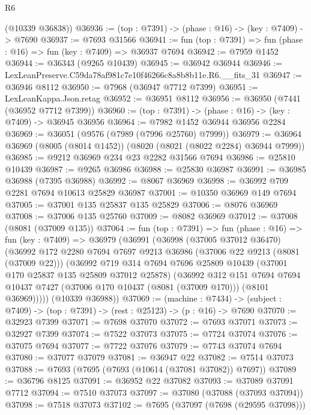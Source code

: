 \begin{lexlean}{R6}
\begin{coremodule}
      (@10339 @36838))
@36936 := (top : @7391) -> (phase : @16) -> (key : @7409) -> @7690
@36937 := @7693 @31566
@36941 := fun (top : @7391) => fun (phase : @16) => fun (key : @7409) => @36937 @7694
@36942 := @7959 @1452
@36944 := @36343 (@9265 @10439)
@36945 := @36942 @36944
@36946 := LexLeanPreserve.C59da78af981c7e10f46266c8a8b8b11e.R6.__fits_31
@36947 := @36946 @8112
@36950 := @7968 (@36947 @7712 @7399)
@36951 := LexLeanKappa.Json.retag
@36952 := @36951 @8112
@36956 := @36950 (@7441 (@36952 @7712 @7399))
@36960 := (top : @7391) -> (phase : @16) -> (key : @7409) -> @36945 @36956
@36964 := @7982 @1452 @36944 @36956 @2284
@36969 := @36051 (@9576 (@7989 (@7996 @25760) @7999))
@36979 := @36964 @36969 (@8005 (@8014 @1452)) (@8020 (@8021 (@8022 @2284) @36944 @7999))
@36985 := @9212 @36969 @234 @23 @2282 @31566 @7694
@36986 := @25810 @10439
@36987 := @9265 @36986
@36988 := @25830 @36987
@36991 := @36985 @36988 (@7395 @36988)
@36992 := @8067 @36969
@36998 := @36992 @709 @2281 @7694 @10613 @25829 @36987
@37001 := @10350 @36969 @149 @7694
@37005 := @37001 @135 @25837 @135 @25829
@37006 := @8076 @36969
@37008 := @37006 @135 @25760
@37009 := @8082 @36969
@37012 := @37008 (@8081 (@37009 @135))
@37064 := fun (top : @7391) =>
  fun (phase : @16) =>
  fun (key : @7409) =>
  @36979
    (@36991
      (@36998
        (@37005 @37012 @36470)
        (@36992
          @172
          @2280
          @7694
          @7697
          @9213
          @36986
          (@37006 @22 @9213 (@8081 (@37009 @22)))
          (@36992
            @719
            @314
            @7694
            @7696
            @25809
            @10439
            (@37001 @170 @25837 @135 @25809 @37012 @25878)
            (@36992
              @312
              @151
              @7694
              @7694
              @10437
              @7427
              (@37006 @170 @10437 (@8081 (@37009 @170)))
              (@8101 @36969)))))
      (@10339 @36988))
@37069 := (machine : @7434) ->
  (subject : @7409) -> (top : @7391) -> (rest : @25123) -> (p : @16) -> @7690
@37070 := @32923 @7399
@37071 := @7698 @37070
@37072 := @7693 @37071
@37073 := @32927 @7399
@37074 := @7522 @37073
@37075 := @7724 @37074
@37076 := @37075 @7694
@37077 := @7722 @37076
@37079 := @7743 @37074 @7694
@37080 := @37077 @37079
@37081 := @36947 @22
@37082 := @7514 @37073
@37088 := @7693 (@7695 (@7693 (@10614 (@37081 @37082)) @7697))
@37089 := @36796 @8125
@37091 := @36952 @22 @37082
@37093 := @37089 @37091 @7712
@37094 := @7510 @37073
@37097 := @37080 (@37088 (@37093 @37094))
@37098 := @7518 @37073
@37102 := @7695 (@37097 (@7698 (@29595 @37098)))

\end{coremodule}
\end{lexlean}
